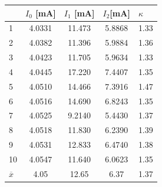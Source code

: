\documentclass[czech,11pt,a4paper]{article}
\begin{document}
\begin{center}
\begin{tabular}{|l|c|c|c|}
		
	\end{tabular}
	\begin{tabular}{|l|c|c|c|c|}
		\hline
		& \multicolumn{1}{l|}{$I_0$ {[}mA{]}} & \multicolumn{1}{l|}{$I_1$ {[}mA{]}} & \multicolumn{1}{l|}{$I_2${[}mA{]}} & \multicolumn{1}{l|}{$\kappa$} \\ \hline
		1  & 4.0331                           & 11.473                          & 5.8868                          & 1.33                       \\ \hline
		2  & 4.0382                           & 11.396                          & 5.9884                          & 1.36                       \\ \hline
		3  & 4.0423                           & 11.705                          & 5.9634                          & 1.33                       \\ \hline
		4  & 4.0445                           & 17.220                           & 7.4407                          & 1.35                       \\ \hline
		5  & 4.0510                            & 14.466                          & 7.3916                          & 1.47                       \\ \hline
		6  & 4.0516                           & 14.690                         & 6.8243                          & 1.35                       \\ \hline
		7  & 4.0525                           & 9.2140                           & 5.4430                           & 1.37                       \\ \hline
		8  & 4.0518                           & 11.830                           & 6.2390                           & 1.39                       \\ \hline
		9  & 4.0531                           & 12.833                          & 6.4740                           & 1.38                       \\ \hline
		10 & 4.0547                           & 11.640                           & 6.0623                          & 1.35                       \\ \hline \hline
		$\overline{x}$  & \multicolumn{1}{c|}{4.05}        & \multicolumn{1}{c|}{12.65}      & \multicolumn{1}{c|}{6.37}       & \multicolumn{1}{c|}{1.37}  \\ \hline
	\end{tabular}
	\end{center}
	
\end{document}
